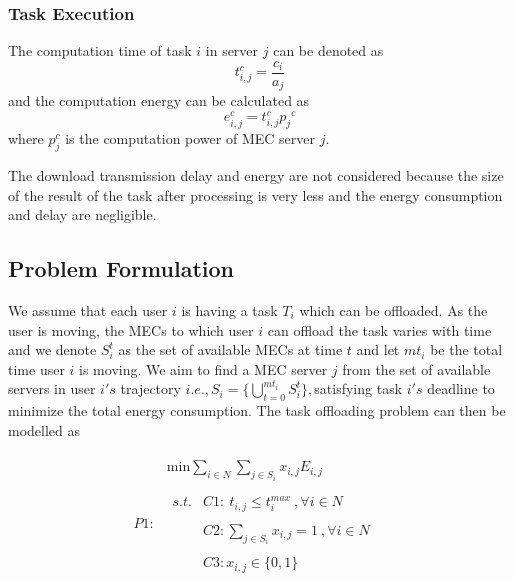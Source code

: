 \documentclass[conference]{IEEEtran}
\begin{document}
\subsubsection{Task Execution}
 The computation time of task $i$ in server $j$ can be denoted as
\begin{equation} \label{t_exec}
t^c_{i,j}=\frac{c_i}{a_j}
\end{equation}
and the computation energy can be calculated as 
\begin{equation} \label{e_exec}
e^c_{i,j}=t^c_{i,j}{p^{\ }_j}^c
\end{equation}
where $p^c_j$ is the computation power of MEC server $j$. 

 The download transmission delay and energy are not considered because the size of the result of the task after processing is very less and the energy consumption and delay are negligible.

\subsection{ Problem Formulation}
We assume that each user $i$ is having a task $T_i$ which can be offloaded. As the user is moving, the MECs to which user $i$ can offload the task varies with time and we denote $S^t_i$ as the set of available MECs at time $t$ and let $mt_i$ be the total time user $i$ is moving. We aim to find a MEC server $j$ from the set of available servers in user $i's$ trajectory  ${i.e.,S_i=\{\bigcup^{mt_i}_{t=0}{S^t_i\}},}$satisfying task $i's$ deadline to minimize the total energy consumption. The task offloading problem can then be modelled as
 
\[P1: \begin{array}{c}
 \begin{array}{c}
{\mathrm{min} \sum_{i\in N}{\sum_{j\in S_i}x_{i,j}E_{i,j}}} \\ \\
 \begin{array}{cc}
s.t. & C1:{\ t}_{i,j}\le t^{max}_i\ ,\forall i\in N \\ \\
\  & C2:\sum_{j\in S_i}{x_{i,j}}=1\ ,\forall i\in N \\ \\
\  & C3:x_{i,j}\in \{0,1\}\  \end{array} \\ \\
 \end{array}
 \end{array}
\] 
\end{document}
